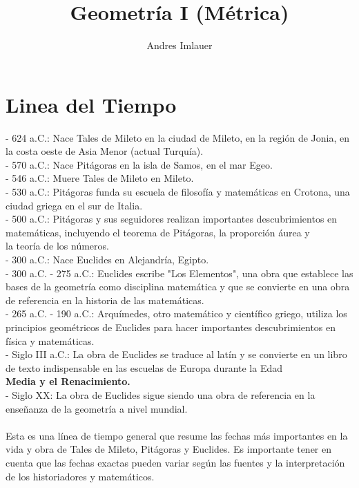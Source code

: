 \documentclass[10pt]{article}
\begin{document}
\fontsize{14}{14}\selectfont{}

\title{Geometría I (Métrica)}
\author{Andres Imlauer}
\def\spanishdate{\def\today{\number\day~de~\ifcase\month\or
enero\or febrero\or marzo\or abril\or mayo\or junio\or
julio\or agosto\or septiembre\or octubre\or noviembre\or
diciembre\fi~2023}}
\spanishdate
\maketitle

\section{Linea del Tiempo}
- 624 a.C.: Nace Tales de Mileto en la ciudad de Mileto, en la región de Jonia, en la costa oeste de Asia Menor (actual Turquía). \\
- 570 a.C.: Nace Pitágoras en la isla de Samos, en el mar Egeo.\\
- 546 a.C.: Muere Tales de Mileto en Mileto.\\
- 530 a.C.: Pitágoras funda su escuela de filosofía y matemáticas en Crotona, una ciudad griega en el sur de Italia.\\
- 500 a.C.: Pitágoras y sus seguidores realizan importantes descubrimientos en matemáticas, incluyendo el teorema de Pitágoras, la proporción áurea y\\
la teoría de los números.\\
- 300 a.C.: Nace Euclides en Alejandría, Egipto.\\
- 300 a.C. - 275 a.C.: Euclides escribe "Los Elementos", una obra que establece las bases de la geometría como disciplina matemática y que se convierte en una obra de referencia en la historia de las matemáticas.\\
- 265 a.C. - 190 a.C.: Arquímedes, otro matemático y científico griego, utiliza los principios geométricos de Euclides para hacer importantes descubrimientos en física y matemáticas.\\
- Siglo III a.C.: La obra de Euclides se traduce al latín y se convierte en un libro de texto indispensable en las escuelas de Europa durante la Edad\\
{\bf Media y el Renacimiento.} \\
- Siglo XX: La obra de Euclides sigue siendo una obra de referencia en la enseñanza de la geometría a nivel mundial.\\
\\
Esta es una línea de tiempo general que resume las fechas más importantes en la vida y obra de Tales de Mileto, Pitágoras y Euclides. Es importante tener en cuenta que las fechas exactas pueden variar según las fuentes y la interpretación de los historiadores y matemáticos.
\end{document}
